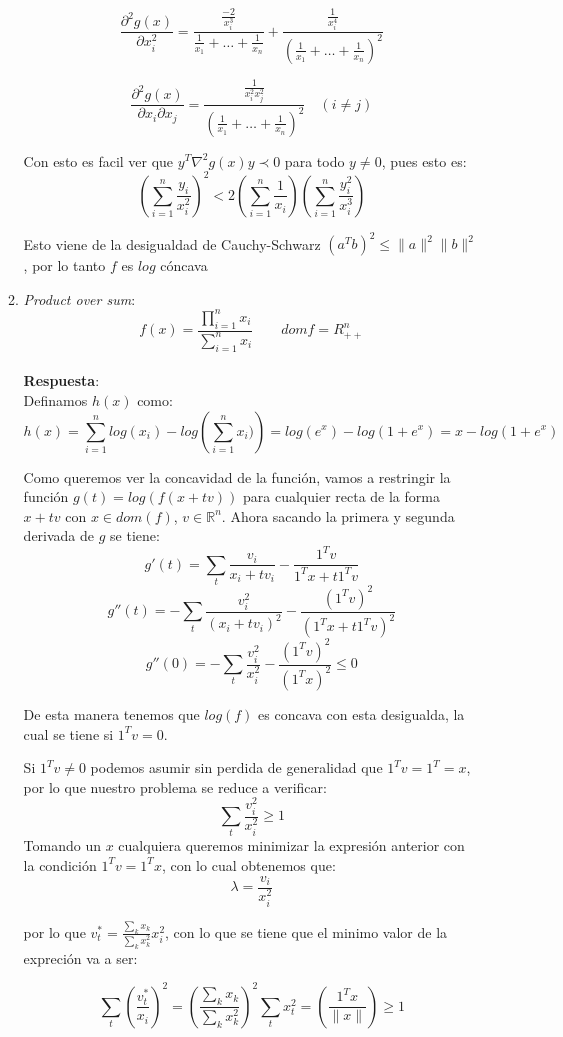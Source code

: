\documentclass[12pt, oneside]{article}%
\begin{document}
\begin{enumerate}
\begin{enumerate}
     $$\frac{\partial^2 g(x)}{\partial x_i^2} = \frac{\frac{-2}{x_i^3}}{\frac{1}{x_1} + \dots + \frac{1}{x_n}} + \frac{\frac{1}{x_i^4}}{(\frac{1}{x_1} + \dots + \frac{1}{x_n})^2}$$
     
     $$\frac{\partial^2 g(x)}{\partial x_i \partial x_j} = \frac{\frac{1}{x_i^2 x_j^2}}{(\frac{1}{x_1} + \dots + \frac{1}{x_n})^2} \quad (i \neq j) $$ 
    
    Con esto es facil ver que $y^T \nabla^2g(x)y \prec 0$ para todo $y \neq 0$, pues esto es:
    $$\left(\sum_{i=1}^n \frac{y_i}{x_i^2}\right)^2 < 2\left(\sum_{i=1}^n \frac{1}{x_i}\right) \left(\sum_{i=1}^n \frac{y_i^2}{x_i^3}\right)$$
    
    Esto viene de la desigualdad de Cauchy-Schwarz $(a^Tb)^2 \leq \|a\|^2 \|b\|^2$, por lo tanto $f$ es $log$ cóncava 
    \item \textit{Product over sum}:
    $$f(x) = \frac{\prod_{i=1}^n x_i}{\sum_{i=1}^n x_i} \qquad dom f = R_{++}^n $$\\
    \textbf{Respuesta}: \\
    Definamos $h(x)$ como:
    $$h(x) = \sum_{i=1}^n log(x_i) - log \left(\sum_{i=1}^n x_i)\right) = log(e^x) -log(1+e^x) = x - log(1+e^x)$$
    
    Como queremos ver la concavidad de la función, vamos a restringir la función $g(t) = log(f(x+tv))$ para cualquier recta de la forma $x+tv$ con $x \in dom(f)$, $v \in \mathbb{R}^n$. Ahora sacando la primera y segunda derivada de $g$ se tiene: 
    $$g'(t) = \sum_t \frac{v_i}{x_i+tv_i} - \frac{1^T v}{1^Tx + t1^Tv}$$
    $$g''(t) = - \sum_t \frac{v_i^2}{(x_i+tv_i)^2} - \frac{(1^T v)^2}{(1^Tx + t1^Tv)^2}$$
     $$g''(0) = - \sum_t \frac{v_i^2}{x_i^2} - \frac{(1^T v)^2}{(1^Tx)^2} \leq 0$$
     
     De esta manera tenemos que $log(f)$ es concava con esta desigualda, la cual se tiene si $1^Tv = 0$. 
     
     Si $1^Tv \neq 0$ podemos asumir sin perdida de generalidad que $1^Tv = 1^T = x$, por lo que nuestro problema se reduce a verificar:
     $$\sum_t \frac{v_i^2}{x_i^2} \geq 1$$
     Tomando un $x$ cualquiera queremos minimizar la expresión anterior con la condición $1^Tv = 1^Tx$, con lo cual obtenemos que:
     $$\lambda = \frac{v_i}{x_i^2} $$
     
     por lo que $v_t^* = \frac{\sum_k x_k}{\sum_k x_k^2}x_i^2$, con lo que se tiene que el minimo valor de la expreción va a ser:
     
     $$\sum_t \left(\frac{v_t^*}{x_i} \right)^2 = \left(\frac{\sum_k x_k}{\sum_k x_k^2}\right)^2 \sum_t x_t^2 = \left( \frac{1^Tx}{\|x\|} \right) \geq 1$$
     

\end{enumerate}
\end{enumerate}
\end{document}
